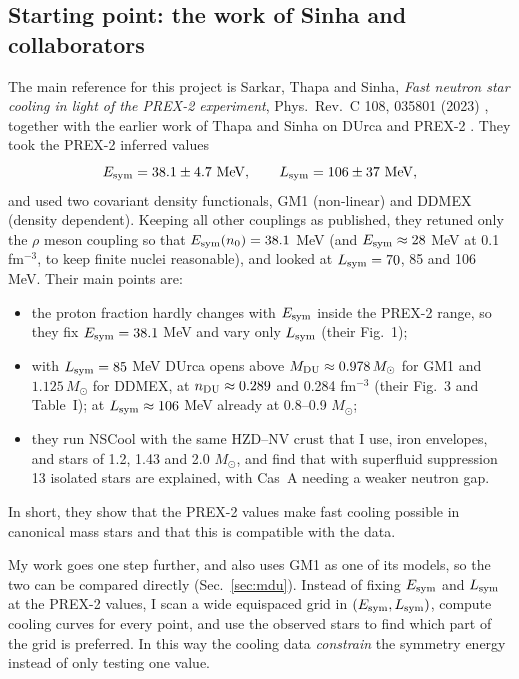 \documentclass[11pt,a4paper]{article}
\newcommand{\Esym}{E_{\rm sym}}
\newcommand{\Lsym}{L_{\rm sym}}
\newcommand{\Msun}{M_\odot}
\begin{document}
\subsection{Starting point: the work of Sinha and collaborators}
The main reference for this project is Sarkar, Thapa and Sinha, \emph{Fast neutron star cooling in light of the PREX-2 experiment}, Phys.\ Rev.\ C 108, 035801 (2023) \cite{Sarkar2023}, together with the earlier work of Thapa and Sinha on DUrca and PREX-2 \cite{ThapaSinha2022}. They took the PREX-2 inferred values \cite{PREX2,Reed2021}
\begin{equation}
\Esym = 38.1\pm 4.7~{\rm MeV},\qquad \Lsym = 106\pm 37~{\rm MeV},
\end{equation}
and used two covariant density functionals, GM1 (non-linear) and DDMEX (density dependent). Keeping all other couplings as published, they retuned only the $\rho$ meson coupling so that $\Esym(n_0)=38.1$ MeV (and $\Esym\approx28$ MeV at 0.1 fm$^{-3}$, to keep finite nuclei reasonable), and looked at $\Lsym=70$, 85 and 106 MeV. Their main points are:
\begin{itemize}
\item the proton fraction hardly changes with $\Esym$ inside the PREX-2 range, so they fix $\Esym=38.1$ MeV and vary only $\Lsym$ (their Fig.~1);
\item with $\Lsym=85$ MeV DUrca opens above $M_{\rm DU}\approx0.978\,\Msun$ for GM1 and $1.125\,\Msun$ for DDMEX, at $n_{\rm DU}\approx0.289$ and 0.284 fm$^{-3}$ (their Fig.~3 and Table~I); at $\Lsym\approx106$ MeV already at 0.8--0.9 $\Msun$;
\item they run NSCool with the same HZD--NV crust that I use, iron envelopes, and stars of 1.2, 1.43 and 2.0 $\Msun$, and find that with superfluid suppression 13 isolated stars are explained, with Cas~A needing a weaker neutron gap.
\end{itemize}
In short, they show that the PREX-2 values make fast cooling possible in canonical mass stars and that this is compatible with the data.

My work goes one step further, and also uses GM1 as one of its models, so the two can be compared directly (Sec.~\ref{sec:mdu}). Instead of fixing $\Esym$ and $\Lsym$ at the PREX-2 values, I scan a wide equispaced grid in $(\Esym,\Lsym)$, compute cooling curves for every point, and use the observed stars to find which part of the grid is preferred. In this way the cooling data \emph{constrain} the symmetry energy instead of only testing one value.
\end{document}
